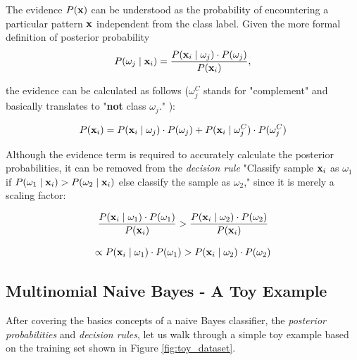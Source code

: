 \documentclass{article}
\begin{document}
The evidence $P(\textbf x)$ can be understood as the probability of encountering a particular pattern $\textbf x$ independent from the class label. Given the more formal definition of posterior probability
\begin{equation} P(\omega_j \mid \textbf x_i) = \frac{P(\textbf x_i \mid \omega_j) \cdot P(\omega_j)}{P(\textbf x_i)}, \end{equation}

the evidence can be calculated as follows ($\omega_j^C$ stands for "complement" and basically translates to "\textbf{not} class $\omega_j$." ):

\begin{equation}P(\textbf x_i) = P(\textbf x_i \mid \omega_j) \cdot P(\omega_j) + P(\textbf x_i \mid \omega_j^C) \cdot P(\omega_j^C)\end{equation}



 Although the evidence term is required to accurately calculate the posterior probabilities, it can be removed from the \emph{decision rule} "Classify sample $\textbf x_i$ as $\omega_1$ if $P(\omega_1 \mid \textbf x_i) > P(\omega_2 \mid \textbf x_i)$ else classify the sample as $\omega_2$,"   since it is merely a scaling factor:


\begin{equation}  \frac{P(\textbf x_i \mid \omega_1) \cdot P(\omega_1)}{P(\textbf x_i)} > \frac{P(\textbf x_i \mid \omega_2) \cdot P(\omega_2)}{P(\textbf x_i)} \end{equation}

\begin{equation}\propto P(\textbf x_i \mid \omega_1) \cdot P(\omega_1) > P(\textbf x_i \mid \omega_2) \cdot P(\omega_2)\end{equation}




\subsection{Multinomial Naive Bayes - A Toy Example}
\label{sec:multinomial_naive_bayes-a_toy_example}

After covering the basics concepts of a naive Bayes classifier, the \emph{posterior probabilities} and \emph{decision rules}, let us walk through a simple toy example based on the training set shown in Figure \ref{fig:toy_dataset}.
\end{document}
